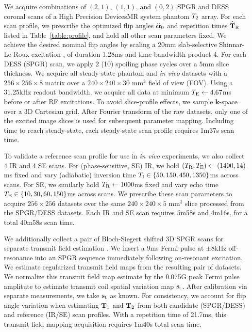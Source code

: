 We acquire combinations 
of $(2,1)$, $(1,1)$, and $(0,2)$ SPGR and DESS coronal scans 
of a High Precision Devices\regis MR system phantom $T_2$ array.
For each scan profile, 
we prescribe the optimized flip angles $\widehat{\boldsymbol{\alpha}}_0$ 
and repetition times $\widehat{\mathbf{T}}_{\mathrm{R}}$ 
listed in Table~\ref{table:profile},
 and hold all other scan parameters fixed. 
We achieve the desired nominal flip angles 
by scaling a 20mm slab-selective Shinnar-Le Roux excitation \cite{pauly:91:prf}, 
of duration 1.28ms and time-bandwidth product 4. 
For each DESS (SPGR) scan, 
we apply 2 (10) spoiling phase cycles 
over a $5$mm slice thickness. 
We acquire all steady-state phantom and \emph{in vivo} datasets 
with a $256 \times 256 \times 8$ matrix 
over a $240 \times 240 \times 30$ mm$^3$ field of view (FOV). 
Using a 31.25kHz readout bandwidth, 
we acquire all data at minimum $T_\mathrm{E} \gets 4.67$ms 
before or after RF excitations. 
To avoid slice-profile effects, 
we sample $\mathbf{k}$-space over a 3D Cartesian grid. 
After Fourier transform of the raw datasets, 
only one of the excited image slices 
is used for subsequent parameter mapping. 
Including time to reach steady-state, 
each steady-state scan profile requires 1m37s scan time.

To validate a reference scan profile 
for use in \emph{in vivo} experiments, 
we also collect 4 IR and 4 SE scans.
For (phase-sensitive, SE) IR, 
we hold $(T_\mathrm{R}, T_\mathrm{E}) \gets (1400, 14)$ms fixed 
and vary (adiabatic) inversion time 
$\TI \in \set{50, 150, 450, 1350}$ms across scans.
For SE, we similarly hold $T_\mathrm{R} \gets 1000$ms fixed 
and vary echo time $\TE \in \set{10, 30, 60, 150}$ms across scans.
We prescribe these scan parameters 
to acquire $256 \times 256$ datasets 
over the same $240 \times 240 \times 5$ mm$^3$ slice processed 
from the SPGR/DESS datasets. 
Each IR and SE scan requires 5m58s and 4m16s, 
for a total 40m58s scan time.

We additionally collect a pair 
of Bloch-Siegert shifted 3D SPGR scans 
for separate transmit field estimation 
\cite{sacolick:10:bmb}. 
We insert a 9ms Fermi pulse 
at $\pm8$kHz off-resonance
into an SPGR sequence immediately following on-resonant excitation.
We estimate regularized transmit field maps \cite{sun:14:reo}
from the resulting pair of datasets.
We normalize this transmit field map estimate
by the 0.075G peak Fermi pulse amplitute
to estimate transmit coil spatial variation map $\mathbf{s}_\mathrm{t}$.
After calibration via separate measurements,
we take $\mathbf{s}_\mathrm{t}$ as known.
For consistency, we account for flip angle variation 
when estimating $\mathbf{T}_1$ and $\mathbf{T}_2$ 
from both candidate (SPGR/DESS) 
and reference (IR/SE) scan profiles.
With a repetition time of 21.7ms, 
this transmit field mapping acquisition requires 
1m40s total scan time.

